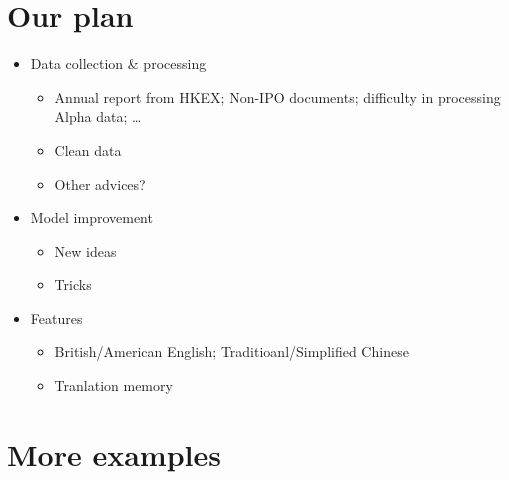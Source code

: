 \documentclass[11pt]{article}
\providecommand{\tightlist}{%
      \setlength{\itemsep}{0pt}\setlength{\parskip}{0pt}}
\begin{document}
    \section{Our plan}\label{our-plan}

\begin{itemize}
\tightlist
\item
  Data collection \& processing

  \begin{itemize}
  \tightlist
  \item
    Annual report from HKEX; Non-IPO documents; difficulty in processing
    Alpha data; \ldots{}
  \item
    Clean data
  \item
    Other advices?
  \end{itemize}
\item
  Model improvement

  \begin{itemize}
  \tightlist
  \item
    New ideas
  \item
    Tricks
  \end{itemize}
\item
  Features

  \begin{itemize}
  \tightlist
  \item
    British/American English; Traditioanl/Simplified Chinese
  \item
    Tranlation memory
  \end{itemize}
\end{itemize}

    \section{More examples}\label{more-examples}
\end{document}
